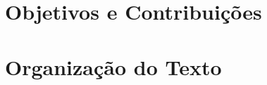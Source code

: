\section{Objetivos e Contribuições}
\label{sec:objetivos}

\lipsum[1 - 2]

\section{Organização do Texto}
\label{sec:organizacao}

\lipsum[3 - 3]
